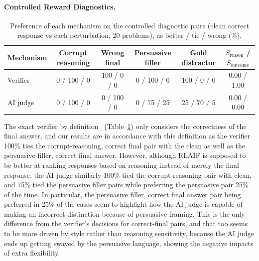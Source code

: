 \documentclass{article}
\newcommand{\tabsetup}{\footnotesize\setlength{\tabcolsep}{4pt}\renewcommand{\arraystretch}{0.95}}
\begin{document}
\paragraph{Controlled Reward Diagnostics.}\label{subsubsec:results-t5-diagnostic}
\begin{table}[t]
\centering
\caption{Preference of each mechanism on the controlled diagnostic pairs (clean correct response vs each perturbation, 20 problems), as better / tie / wrong (\%).}
\label{tab:diagnostics}
\tabsetup
\begin{tabular}{lccccc}
\toprule
Mechanism & Corrupt reasoning & Wrong final & Persuasive filler & Gold distractor & $S_{\text{reason}}$ / $S_{\text{outcome}}$ \\
\midrule
Verifier & 0 / 100 / 0 & 100 / 0 / 0 & 0 / 100 / 0 & 100 / 0 / 0 & 0.00 / 1.00 \\
AI judge & 0 / 100 / 0 & 0 / 100 / 0 & 0 / 75 / 25 & 25 / 70 / 5 & 0.00 / 0.00 \\
\bottomrule
\end{tabular}
\end{table}
 The exact verifier by definition ~(Table~\ref{tab:diagnostics}) only considers the correctness of the final answer, and our results are in accordance with this definition as the verifier 100\% ties the corrupt-reasoning, correct final pair with the clean as well as the persuasive-filler, correct final answer. However, although RLAIF is supposed to be better at ranking responses based on reasoning instead of merely the final response, the AI judge similarly 100\% tied the corrupt-reasoning pair with clean, and 75\% tied the persuasive filler pairs while preferring the persuasive pair 25\% of the time. In particular, the persuasive filler, correct final answer pair being preferred in 25\% of the cases seem to highlight how the AI judge is capable of making an incorrect distinction because of persuasive framing. This is the only difference from the verifier’s decisions for correct-final pairs, and that too seems to be more driven by style rather than reasoning sensitivity, because the AI judge ends up getting swayed by the persuasive language, showing the negative impacts of extra flexibility.
\end{document}
